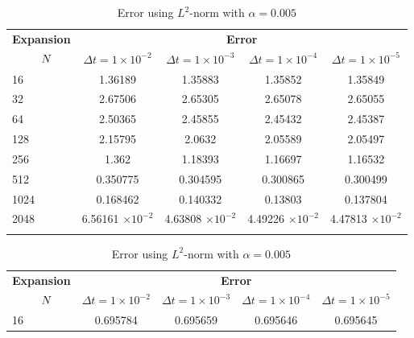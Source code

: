 	\begin{table}[H]
	\begin{tabular}{lcccc}
		\toprule
		\multicolumn{1}{c}{\textbf{Expansion}} & \multicolumn{4}{c}{\textbf{Error}} \\
		$\hspace{9mm}N$ & $\Delta t=1\times 10^{-2}$ & $\Delta t=1\times 10^{-3}$ & $\Delta t=1\times 10^{-4}$ & $\Delta t=1\times 10^{-5}$ \\
		\midrule
		\hspace{7mm} 16 & 1.36189   & 1.35883    & 1.35852   & 1.35849   \\
		\midrule
		\hspace{7mm} 32 & 2.67506   & 2.65305    & 2.65078   & 2.65055   \\
		\midrule
		\hspace{7mm} 64 & 2.50365   & 2.45855    & 2.45432   & 2.45387   \\
		\midrule
		\hspace{7mm} 128 & 2.15795   & 2.0632     & 2.05589   & 2.05497   \\
		\midrule
		\hspace{7mm} 256 & 1.362     & 1.18393    & 1.16697   & 1.16532   \\
		\midrule
		\hspace{7mm} 512 & 0.350775  & 0.304595   & 0.300865  & 0.300499  \\
		\midrule
		\hspace{7mm} 1024 & 0.168462  & 0.140332   & 0.13803   & 0.137804  \\
		\midrule
		\hspace{7mm} 2048 & 6.56161 $\times 10^{-2}$ & 4.63808 $\times 10^{-2}$  & 4.49226 $\times 10^{-2}$ & 4.47813 $\times 10^{-2}$ \\
		\\
		\bottomrule
	\end{tabular}
	\caption{Error using $L^2$-norm with $\alpha=0.005$}
	\label{Collocation_tabla_L2_alpha=005}
	\vspace{1cm}
	\begin{tabular}{lcccc}
		\toprule
		\multicolumn{1}{c}{\textbf{Expansion}} & \multicolumn{4}{c}{\textbf{Error}} \\
		$\hspace{9mm}N$ & $\Delta t=1\times 10^{-2}$ & $\Delta t=1\times 10^{-3}$ & $\Delta t=1\times 10^{-4}$ & $\Delta t=1\times 10^{-5}$ \\
		\midrule
		\hspace{7mm} 16 & 0.695784 & 0.695659  & 0.695646  & 0.695645 \\

\end{tabular}
\end{table}
